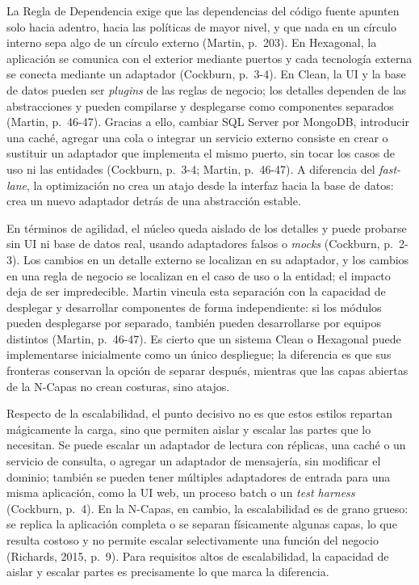 \documentclass[12pt,a4paper]{article}
\begin{document}
La Regla de Dependencia exige que las dependencias del código fuente apunten solo hacia adentro, hacia las políticas de mayor nivel, y que nada en un círculo interno sepa algo de un círculo externo (Martin, p.~203). En Hexagonal, la aplicación se comunica con el exterior mediante puertos y cada tecnología externa se conecta mediante un adaptador (Cockburn, p.~3-4). En Clean, la UI y la base de datos pueden ser \emph{plugins} de las reglas de negocio; los detalles dependen de las abstracciones y pueden compilarse y desplegarse como componentes separados (Martin, p.~46-47). Gracias a ello, cambiar SQL Server por MongoDB, introducir una caché, agregar una cola o integrar un servicio externo consiste en crear o sustituir un adaptador que implementa el mismo puerto, sin tocar los casos de uso ni las entidades (Cockburn, p.~3-4; Martin, p.~46-47). A diferencia del \emph{fast-lane}, la optimización no crea un atajo desde la interfaz hacia la base de datos: crea un nuevo adaptador detrás de una abstracción estable.

En términos de agilidad, el núcleo queda aislado de los detalles y puede probarse sin UI ni base de datos real, usando adaptadores falsos o \emph{mocks} (Cockburn, p.~2-3). Los cambios en un detalle externo se localizan en su adaptador, y los cambios en una regla de negocio se localizan en el caso de uso o la entidad; el impacto deja de ser impredecible. Martin vincula esta separación con la capacidad de desplegar y desarrollar componentes de forma independiente: si los módulos pueden desplegarse por separado, también pueden desarrollarse por equipos distintos (Martin, p.~46-47). Es cierto que un sistema Clean o Hexagonal puede implementarse inicialmente como un único despliegue; la diferencia es que sus fronteras conservan la opción de separar después, mientras que las capas abiertas de la N-Capas no crean costuras, sino atajos.

Respecto de la escalabilidad, el punto decisivo no es que estos estilos repartan mágicamente la carga, sino que permiten aislar y escalar las partes que lo necesitan. Se puede escalar un adaptador de lectura con réplicas, una caché o un servicio de consulta, o agregar un adaptador de mensajería, sin modificar el dominio; también se pueden tener múltiples adaptadores de entrada para una misma aplicación, como la UI web, un proceso batch o un \emph{test harness} (Cockburn, p.~4). En la N-Capas, en cambio, la escalabilidad es de grano grueso: se replica la aplicación completa o se separan físicamente algunas capas, lo que resulta costoso y no permite escalar selectivamente una función del negocio (Richards, 2015, p.~9). Para requisitos altos de escalabilidad, la capacidad de aislar y escalar partes es precisamente lo que marca la diferencia.
\end{document}
